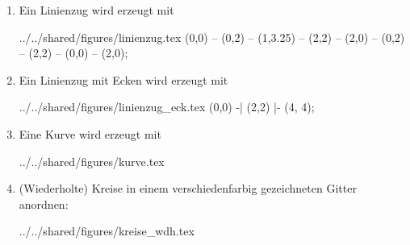 \documentclass[ngerman,               %
               a4paper,               %
               fleqn,                 %
                     ]{scrartcl}       %
\begin{document}
\begin{enumerate}
  \item Ein Linienzug wird erzeugt mit
\begin{verbatimwrite}{../../shared/figures/linienzug.tex}
\tikz \draw[thick,rounded corners=2pt] %
(0,0) -- (0,2) -- (1,3.25) -- (2,2) -- %
(2,0) -- (0,2) -- (2,2) -- (0,0) -- (2,0);  %
\end{verbatimwrite}
    

    
  \item Ein Linienzug mit Ecken wird erzeugt mit
\begin{verbatimwrite}{../../shared/figures/linienzug_eck.tex}
  \tikz \draw[thick]                   %
  (0,0) -| (2,2) |- (4, 4);            %
\end{verbatimwrite}
    

    
  \item Eine Kurve wird erzeugt mit
\begin{verbatimwrite}{../../shared/figures/kurve.tex}
\end{verbatimwrite}
    

    
  \item (Wiederholte) Kreise in einem verschiedenfarbig gezeichneten Gitter anordnen:
\begin{verbatimwrite}{../../shared/figures/kreise_wdh.tex}
\end{verbatimwrite}
    


\end{enumerate}
\end{document}
